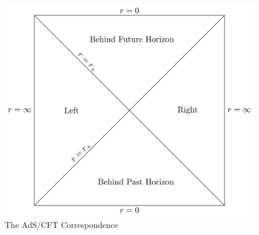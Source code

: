 \documentclass[10pt,aspectratio=169]{beamer}
\begin{document}
\begin{frame}
\begin{minipage}[t]{0.48\linewidth}
\begin{figure}
\begin{center}
        \includegraphics[scale=0.3]{2SidedBH}    
    
    \end{center}
    \caption{The AdS/CFT Correspondence}
\end{figure}

\end{minipage}

\end{frame}
\end{document}
